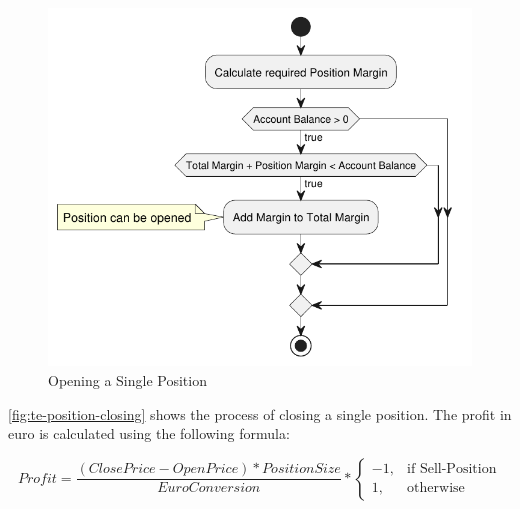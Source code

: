 \begin{figure}[H]
    \centering
    \includegraphics[width=\textwidth]{images/trading-engine/position-opening.pdf}
    \caption{Opening a Single Position}
    \label{fig:te-position-opening}
\end{figure}

\autoref{fig:te-position-closing} shows the process of closing a single position. The profit in euro is calculated using the following formula:

\[
    Profit = \frac{(ClosePrice - OpenPrice) * PositionSize}{EuroConversion} *
    \begin{cases}
        -1,& \text{if Sell-Position}\\
        1,              & \text{otherwise}
    \end{cases}
\]

